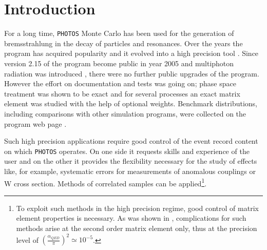 \documentclass[]{Photos_interface_design}
\begin{document}
\maketitle

\tableofcontents{}

\newpage

\section{Introduction}
For a long time, {\tt PHOTOS} Monte Carlo \cite{Barberio:1990ms,Barberio:1993qi} 
has been used for the generation of bremsstrahlung in the decay of particles and resonances.
Over the years the program has acquired
popularity and it evolved into a high 
precision tool \cite{Golonka:2006tw}. Since version 2.15 of the program become 
public in year 2005 and multiphoton radiation was 
introduced \cite{Golonka:2005pn}, there were no further public upgrades 
of the program. However the effort on documentation and tests was going on;
 phase space treatment was shown to be 
exact \cite{Nanava:2006vv} and for several 
processes \cite{Golonka:2006tw,Nanava:2006vv,Nanava:2009vg}
an exact matrix element was studied with the help of optional weights.
Benchmark distributions, including comparisons with  
other simulation programs, were collected on the program web page \cite{Photos_tests}. 

 Such high precision applications require good control of the event record content on which {\tt PHOTOS} operates. On one side it 
requests skills and experience of the user and on the other it provides 
the flexibility necessary for the study of effects like, for example, systematic errors for 
measurements of anomalous couplings or W cross section. Methods of 
correlated samples  can be applied\footnote{To exploit such methods in 
the high precision regime, good control of matrix element properties is necessary.
As was shown in \cite{Kleiss:1990jv}, complications for such methods arise at the second order matrix element only, thus at the precision level of 
$(\frac{\alpha_{QED}}{\pi})^2 \simeq 10^{-5}$.}. 
\end{document}
